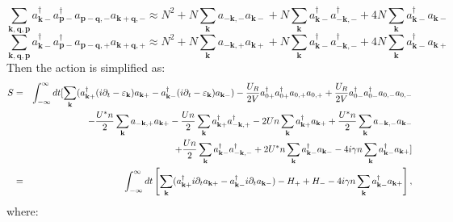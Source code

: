 \documentclass[aps,onecolumn,superscriptaddress,notitlepage,longbibliography]{revtex4-1}
\begin{document}
\begin{equation}
  \sum_{\mathbf{k}, \mathbf{q}, \mathbf{p}} a_{\mathbf{k}-}^{\dagger}
  a_{\mathbf{p}-}^{\dagger} a_{\mathbf{p}-\mathbf{q}, -}
  a_{\mathbf{k}+\mathbf{q}, -} \approx N^2 + N \sum_{\mathbf{k}}
  a_{-\mathbf{k}, -} a_{\mathbf{k}-} + N \sum_{\mathbf{k}}
  a_{\mathbf{k}-}^{\dagger} a_{-\mathbf{k}, -}^{\dagger} + 4 N
  \sum_{\mathbf{k}} a_{\mathbf{k}-}^{\dagger} a_{\mathbf{k}-}
\end{equation}
\begin{equation}
  \sum_{\mathbf{k}, \mathbf{q}, \mathbf{p}} a_{\mathbf{k}-}^{\dagger}
  a_{\mathbf{p}-}^{\dagger} a_{\mathbf{p}-\mathbf{q}, +}
  a_{\mathbf{k}+\mathbf{q}, +} \approx N^2 + N \sum_{\mathbf{k}}
  a_{-\mathbf{k}, +} a_{\mathbf{k}+} + N \sum_{\mathbf{k}}
  a_{\mathbf{k}-}^{\dagger} a_{-\mathbf{k}, -}^{\dagger} + 4 N
  \sum_{\mathbf{k}} a_{\mathbf{k}-}^{\dagger} a_{\mathbf{k}+}
  \label{mean3}
\end{equation}
Then the action is simplified as:
\begin{eqnarray}
  S & = & \int_{- \infty}^{\infty} d t [ \sum_{\mathbf{k}}
  (a^{\dagger}_{\mathbf{k}+} (i \partial_t - \varepsilon_{\mathbf{k}})
  a_{\mathbf{k}+} - a^{\dagger}_{\mathbf{k}-} (i \partial_t -
  \varepsilon_{\mathbf{k}}) a_{\mathbf{k}-}) - \frac{U_R}{2 V} a_{0
  +}^{\dagger} a_{0 +}^{\dagger} a_{0, +} a_{0, +} + \frac{U_R}{2 V} a_{0
  -}^{\dagger} a_{0 -}^{\dagger} a_{0, -} a_{0, -} \nonumber\\
  &  & - \frac{U^{\ast} n}{2} \sum_{\mathbf{k}} a_{-\mathbf{k}, +}
  a_{\mathbf{k}+} - \frac{U n}{2} \sum_{\mathbf{k}}
  a_{\mathbf{k}+}^{\dagger} a_{-\mathbf{k}, +}^{\dagger} - 2 U n
  \sum_{\mathbf{k}} a_{\mathbf{k}+}^{\dagger} a_{\mathbf{k}+} +
  \frac{U^{\ast} n}{2} \sum_{\mathbf{k}} a_{-\mathbf{k}, -}
  a_{\mathbf{k}-} \nonumber\\
  &  & + \frac{U n}{2} \sum_{\mathbf{k}} a_{\mathbf{k}-}^{\dagger}
  a_{-\mathbf{k}, -}^{\dagger} + 2 U^{\ast} n \sum_{\mathbf{k}}
  a_{\mathbf{k}-}^{\dagger} a_{\mathbf{k}-} - 4 i \gamma n
  \sum_{\mathbf{k}} a_{\mathbf{k}-}^{\dagger} a_{\mathbf{k}+}
  \large{\large{}] } \\
  & = & \int_{- \infty}^{\infty} d t \left[ \sum_{\mathbf{k}}
  (a^{\dagger}_{\mathbf{k}+} i \partial_t a_{\mathbf{k}+} -
  a^{\dagger}_{\mathbf{k}-} i \partial_t a_{\mathbf{k}-}) - H_+ + H_- - 4
  i \gamma n \sum_{\mathbf{k}} a_{\mathbf{k}-}^{\dagger} a_{\mathbf{k}+}
  \right], \label{action} 
\end{eqnarray}
where:
\end{document}
